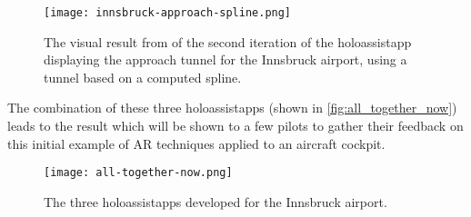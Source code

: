 \begin{figure}[b!]
  \centering
  \texttt{[image: innsbruck-approach-spline.png]}
  \caption{The visual result from of the second iteration of the \gls{holoassistapp} displaying the approach tunnel for the Innsbruck airport, using a tunnel based on a computed spline.}\label{fig:lowi_spline_tunnel.png}
\end{figure}

The combination of these three \glspl{holoassistapp} (shown in \autoref{fig:all_together_now}) leads to the result which will be shown to a few pilots to gather their feedback on this initial example of \gls{AR} techniques applied to an aircraft cockpit.

\begin{figure}[b!]
  \centering
  \texttt{[image: all-together-now.png]}
  \caption{The three \glspl{holoassistapp} developed for the Innsbruck airport.}\label{fig:all_together_now}
\end{figure}